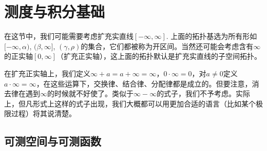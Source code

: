 \chapter{测度与积分基础}

在这节中，我们可能需要考虑扩充实直线$[-\infty,\infty]$. 上面的拓扑基选为所有形如$[-\infty,\alpha)$, $(\beta,\infty]$, $(\gamma,\rho)$的集合，它们都被称为开区间。当然还可能会考虑含有$\infty$的正实轴$[0,\infty]$（扩充正实轴），这上面的拓扑默认是扩充实直线的子空间拓扑。

在扩充正实轴上，我们定义$\infty+a=a+\infty=\infty$，$0\cdot \infty=0$，对$a\neq 0$定义$a\cdot \infty=\infty$，在这些运算下，交换律、结合律、分配律都是成立的。但要注意，消去律在遇到$\infty$的时候就不好使了。类似于$\infty-\infty$的式子，我们不予考虑。实际上，但凡形式上这样的式子出现，我们大概都可以用更加合适的语言（比如某个极限过程）将其说清楚。

\section{可测空间与可测函数}

